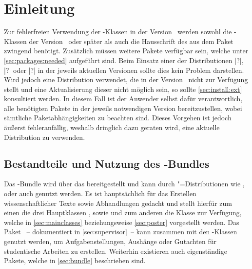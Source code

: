 \chapter{Einleitung}
%
Zur fehlerfreien Verwendung der \TUDScript-Klassen in der Version~\vTUDScript{} 
werden sowohl die \KOMAScript-Klassen der Version~\vKOMAScript{} oder später 
als auch die Hausschrift des \CDs \OpenSans aus dem Paket  
zwingend benötigt. Zusätzlich müssen weitere Pakete verfügbar sein, welche 
unter \autoref{sec:packages:needed} aufgeführt sind. Beim Einsatz einer der 
Distributionen |?|,
|?| oder |?|
in der jeweils aktuellen Versionen sollte dies kein Problem darstellen. Wird 
jedoch eine Distribution verwendet, die \TUDScript in der Version~\vTUDScript{} 
nicht zur Verfügung stellt und eine Aktualisierung dieser nicht möglich sein, 
so sollte \autoref{sec:install:ext} konsultiert werden. In diesem Fall ist der 
Anwender selbst dafür verantwortlich, alle benötigten Pakete in der jeweils 
notwendigen Version bereitzustellen, wobei sämtliche Paketabhängigkeiten zu 
beachten sind. Dieses Vorgehen ist jedoch äußerst fehleranfällig, weshalb 
dringlich dazu geraten wird, eine aktuelle Distribution zu verwenden.



\section{Bestandteile und Nutzung des \TUDScript-Bundles}
%
%
Das \TUDScript-Bundle wird über das \CTAN bereitgestellt und kann durch 
"=Distributionen wie , 
 oder auch  
genutzt werden. Es ist hauptsächlich für das Erstellen wissenschaftlicher 
Texte sowie Abhandlungen gedacht und stellt hierfür zum einen die drei 
Hauptklassen ,  sowie  
und zum anderen die Klasse  zur Verfügung, welche in 
\autoref{sec:mainclasses} beziehungsweise \autoref{sec:poster} vorgestellt 
werden. Das Paket ~-- dokumentiert in 
\autoref{sec:supervisor}~-- kann zusammen mit den \TUDScript-Klassen genutzt 
werden, um Aufgabenstellungen, Aushänge oder Gutachten für studentische 
Arbeiten zu erstellen. Weiterhin existieren auch eigenständige Pakete, welche 
in \autoref{sec:bundle} beschrieben sind. 


